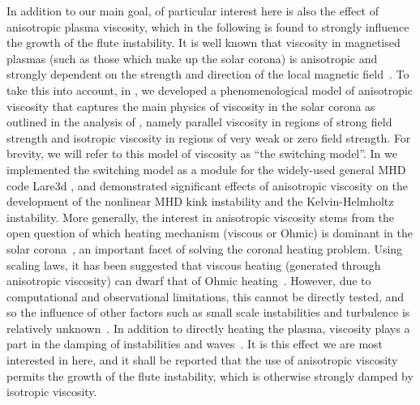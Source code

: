 \documentclass[fleqn,usenatbib]{mnras}
\newcommand{\rs}[2]{{#2}}
\begin{document}
\rs{}{In addition to our main goal, of particular interest here is
also the effect of anisotropic plasma viscosity, which in the following is found to
strongly influence the growth of the \rs{fluting}{flute} instability.}
It is well known that viscosity in magnetised plasmas (such as
\rs{that which makes up}{those which make up} the solar corona) is
anisotropic and strongly dependent on the strength and direction of
the local magnetic
field~\citep{hollwegViscosityChewGoldbergerLowEquations1986,hollwegViscosityMagnetizedPlasma1985,braginskiiTransportProcessesPlasma1965}.
\rs{}{To take this into account, in \citep{mactaggartBraginskiiMagnetohydrodynamicsArbitrary2017},
we developed a phenomenological model of anisotropic viscosity that
captures the main physics of viscosity in the 
solar corona as outlined in the analysis of
\cite{braginskiiTransportProcessesPlasma1965}, namely parallel
viscosity in regions of strong field  strength and isotropic viscosity
in regions of very weak or zero field strength. For brevity, we will
refer to this model of viscosity as ``the switching model''. In
\citep{quinnEffectAnisotropicViscosity2020,quinnKelvinHelmholtzInstabilityCollapse2021} we implemented
the switching model as a module for the widely-used general MHD code
Lare3d \citep{arberStaggeredGridLagrangian2001}, and demonstrated
significant effects of anisotropic viscosity on the 
development of the nonlinear MHD kink instability and the
Kelvin-Helmholtz instability.} \rs{The}{More generally, the} interest in
anisotropic viscosity stems from the \rs{unanswered}{open} question of
which heating mechanism (viscous or Ohmic) is dominant in the solar
corona~\citep{klimchukSolvingCoronalHeating2006}, an important facet
of solving the coronal heating problem. Using scaling laws, it has
been suggested that viscous heating (generated through anisotropic
viscosity) can dwarf that of Ohmic
heating~\citep{craigAnisotropicViscousDissipation2009a,litvinenkoViscousEnergyDissipation2005}.
However,
due to computational and observational limitations, this cannot be
directly tested, and so the influence of other factors such as small
scale instabilities and turbulence is relatively
unknown~\citep{klimchukSolvingCoronalHeating2006}. In addition to
directly heating the plasma, viscosity plays a part in the damping of
instabilities and waves~\citep{rudermanSlowSurfaceWave2000}. It is
this effect we are most interested in here, and it shall be \rs{found}{reported} that
the use of anisotropic viscosity permits the growth of the
\rs{fluting}{flute} instability, which is otherwise strongly damped by
isotropic viscosity. 
\end{document}
